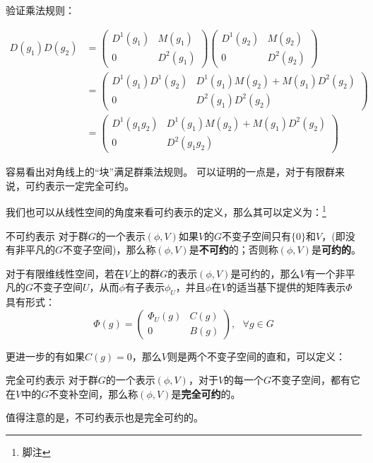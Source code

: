 验证乘法规则：

\begin{align}
D(g_1)D(g_2)&=
\begin{pmatrix}
 D^1(g_1) & M(g_1)\\
 0 & D^2(g_1)
\end{pmatrix}
\begin{pmatrix}
 D^1(g_2) & M(g_2)\\
 0 & D^2(g_2)
\end{pmatrix} \\
&=\begin{pmatrix}
 D^1(g_1)D^1(g_2) & D^1(g_1)M(g_2)+M(g_1)D^2(g_2)\\
 0 & D^2(g_1)D^2(g_2)
\end{pmatrix} \\
&=\begin{pmatrix}
 D^1(g_1g_2) & D^1(g_1)M(g_2)+M(g_1)D^2(g_2)\\
 0 & D^2(g_1g_2)
\end{pmatrix}
\end{align}

容易看出对角线上的“块”满足群乘法规则。
可以证明的一点是，对于有限群来说，可约表示一定完全可约。







我们也可以从线性空间的角度来看可约表示的定义，那么其可以定义为：\footnote{脚注}

\begin{definition}{不可约表示}
对于群$G$的一个表示$(\phi,V)$如果$V$的$G$不变子空间只有$\{0\}$和$V$，(即没有非平凡的$G$不变子空间)，那么称$(\phi,V)$是\textbf{不可约}的；否则称$(\phi,V)$是\textbf{可约的}。
\end{definition}

\begin{definition}{}
对于有限维线性空间，若在$V$上的群$G$的表示$(\phi,V)$是可约的，那么$V$有一个非平凡的$G$不变子空间$U$，从而$\phi$有子表示$\phi_U$，并且$\phi$在$V$的适当基下提供的矩阵表示$\Phi$具有形式：
$$\Phi(g)=\begin{pmatrix}
 \Phi_U(g) & C(g)\\
 0 & B(g)
\end{pmatrix},~~~\forall g\in G$$

\end{definition}

更进一步的有如果$C(g)=0$，那么$V$则是两个不变子空间的直和，可以定义：
\begin{definition}{完全可约表示}
对于群$G$的一个表示$(\phi,V)$，对于$V$的每一个$G$不变子空间，都有它在$V$中的$G$不变补空间，那么称$(\phi,V)$是\textbf{完全可约}的。
\end{definition}

值得注意的是，不可约表示也是完全可约的。












